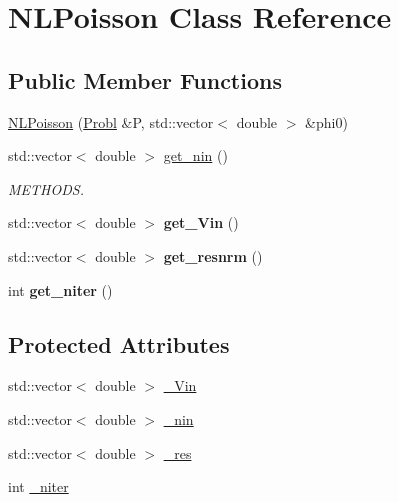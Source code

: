 \hypertarget{classNLPoisson}{\section{N\-L\-Poisson Class Reference}
\label{classNLPoisson}
}
\subsection*{Public Member Functions}
\begin{DoxyCompactItemize}
\item 
\hyperlink{classNLPoisson_a53fc882605e0a03ec9f24e169b630c71}{N\-L\-Poisson} (\hyperlink{classProbl}{Probl} \&P, std\-::vector$<$ double $>$ \&phi0)
\item 
\hypertarget{classNLPoisson_a60dbe42d8820449c1ff049c5ca1c7f37}{std\-::vector$<$ double $>$ \hyperlink{classNLPoisson_a60dbe42d8820449c1ff049c5ca1c7f37}{get\-\_\-nin} ()}\label{classNLPoisson_a60dbe42d8820449c1ff049c5ca1c7f37}

\begin{DoxyCompactList}\small\item\em M\-E\-T\-H\-O\-D\-S. \end{DoxyCompactList}\item 
\hypertarget{classNLPoisson_a89b1adb9cb861a8b38dc04d07dc85a39}{std\-::vector$<$ double $>$ {\bfseries get\-\_\-\-Vin} ()}\label{classNLPoisson_a89b1adb9cb861a8b38dc04d07dc85a39}

\item 
\hypertarget{classNLPoisson_a723d6b30b4f9e9884fdafa7aee71e3c2}{std\-::vector$<$ double $>$ {\bfseries get\-\_\-resnrm} ()}\label{classNLPoisson_a723d6b30b4f9e9884fdafa7aee71e3c2}

\item 
\hypertarget{classNLPoisson_a0e4b899e6a687b697312a990bc97cfeb}{int {\bfseries get\-\_\-niter} ()}\label{classNLPoisson_a0e4b899e6a687b697312a990bc97cfeb}

\end{DoxyCompactItemize}
\subsection*{Protected Attributes}
\begin{DoxyCompactItemize}
\item 
std\-::vector$<$ double $>$ \hyperlink{classNLPoisson_a0fffe8f4cdcc6ed59ec7c83527c2ec2b}{\-\_\-\-Vin}
\item 
std\-::vector$<$ double $>$ \hyperlink{classNLPoisson_a6a4fd2946efe89cce686d43889f31eb3}{\-\_\-nin}
\item 
std\-::vector$<$ double $>$ \hyperlink{classNLPoisson_ab6ae242b8dba8c26f1a0ad8aa1e93f10}{\-\_\-res}
\item 
int \hyperlink{classNLPoisson_ab3168e1f22563d7d9a36feb53e915ca1}{\-\_\-niter}
\end{DoxyCompactItemize}


